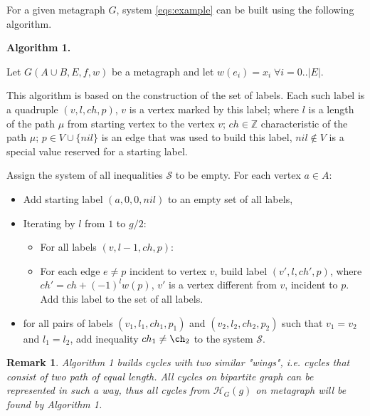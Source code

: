 \documentclass[14pt]{mmcs-article}
\newtheorem{notice}{Remark}
\begin{document}

For a given metagraph $G$, system \eqref{eqs:example} can be built using the following algorithm.

\textbf{Algorithm 1.}

Let $G(A \cup B, E, f, w)$ be a metagraph and let $w(e_i) = x_i \; \forall i = 0..|E|$.


This algorithm is based on the construction of the set of labels.
Each such label is a quadruple $(v, l, ch, p)$,
$v$ is a vertex marked by this label;
where $l$ is a length of the path $\mu$ from starting vertex to the vertex $v$; 
$ch \in \mathbb{Z}$ characteristic of the path $\mu$;
$p \in V \cup \{ nil \}$ is an edge that was used to build this label, $nil \not\in V $ is a special value reserved for a starting label.

Assign the system of all inequalities $\mathcal{S}$ to be empty.
For each vertex $a \in A$:

\begin{itemize}
    \item Add starting label $(a, 0, 0, nil)$ to an empty set of all labels,
    \item Iterating by $l$ from $1$ to $g / 2$:
    \begin{itemize}
        \item For all labels $(v, l - 1, ch, p)$:
        \item
            For each edge $e \not= p$ incident to vertex $v$,
            build label $(v', l, ch', p)$, where $ch' = ch + (-1)^{l} w(p)$, $v'$ is a vertex different from $v$, incident to $p$.
            Add this label to the set of all labels.
    \end{itemize}
    \item for all pairs of labels $(v_1, l_1, ch_1, p_1)$ and $(v_2, l_2, ch_2, p_2)$ such that $v_1 = v_2$ and $l_1 = l_2$, add inequality $ch_1 \neq \ch_2$ to the system $\mathcal{S}$.
\end{itemize}

\begin{notice}
    Algorithm 1 builds cycles with two similar "wings", i.e. cycles that consist of two path of equal length. All cycles on bipartite graph can be represented in such a way, thus all cycles from $\mathcal{H}_G(g)$ on metagraph will be found by Algorithm 1.
\end{notice}
\end{document}
